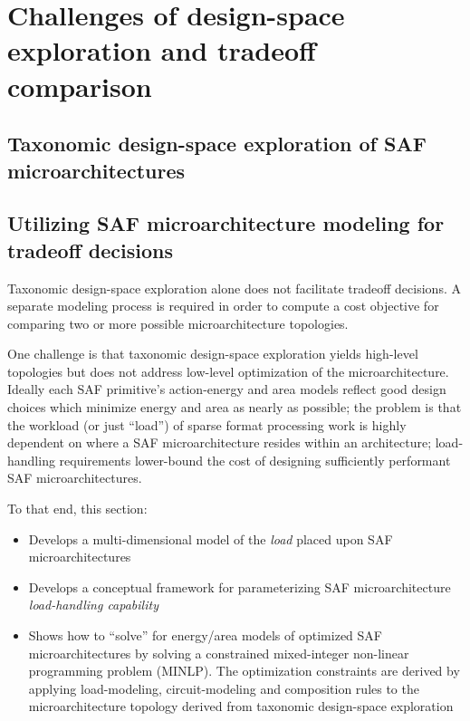 \chapter{Challenges of design-space exploration and tradeoff comparison}

\section{Taxonomic design-space exploration of SAF microarchitectures}

\section{Utilizing SAF microarchitecture modeling for tradeoff decisions}

Taxonomic design-space exploration alone does not facilitate tradeoff decisions. A separate modeling process is required in order to compute a cost objective for comparing two or more possible microarchitecture topologies.

One challenge is that taxonomic design-space exploration yields high-level topologies but does not address low-level optimization of the microarchitecture. Ideally each SAF primitive's action-energy and area models reflect good design choices which minimize energy and area as nearly as possible; the problem is that the workload (or just ``load'') of sparse format processing work is highly dependent on where a SAF microarchitecture resides within an architecture; load-handling requirements lower-bound the cost of designing sufficiently performant SAF microarchitectures.

To that end, this section:

\begin{itemize}
    \item Develops a multi-dimensional model of the \textit{load} placed upon SAF microarchitectures
    \item Develops a conceptual framework for parameterizing SAF microarchitecture \textit{load-handling capability}
    \item Shows how to ``solve'' for energy/area models of optimized SAF microarchitectures by solving a constrained mixed-integer non-linear programming problem (MINLP). The optimization constraints are derived by applying load-modeling, circuit-modeling and composition rules to the microarchitecture topology derived from taxonomic design-space exploration
\end{itemize}

